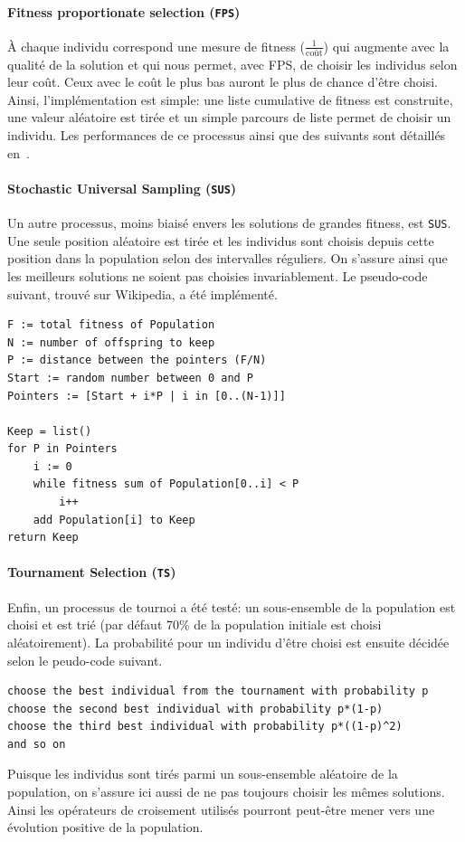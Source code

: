 \documentclass[10pt]{article}
\begin{document}
		\paragraph{Fitness proportionate selection (\texttt{FPS})}{
			À chaque individu correspond une mesure de fitness ($\frac{1}{\text{coût}}$) qui augmente avec la qualité de la solution et qui nous permet, avec FPS, de choisir les individus selon leur coût. Ceux avec le coût le plus bas auront le plus de chance d'être choisi. Ainsi, l'implémentation est simple: une liste cumulative de fitness est construite, une valeur aléatoire est tirée et un simple parcours de liste permet de choisir un individu. Les performances de ce processus ainsi que des suivants sont détaillés en~.
		}
		\paragraph{Stochastic Universal Sampling (\texttt{SUS})}{
			Un autre processus, moins biaisé envers les solutions de grandes fitness, est \texttt{SUS}. Une seule position aléatoire est tirée et les individus sont choisis depuis cette position dans la population selon des intervalles réguliers. On s'assure ainsi que les meilleurs solutions ne soient pas choisies invariablement. Le pseudo-code suivant, trouvé sur Wikipedia, a été implémenté.
			\begin{lstlisting}
F := total fitness of Population
N := number of offspring to keep
P := distance between the pointers (F/N)
Start := random number between 0 and P
Pointers := [Start + i*P | i in [0..(N-1)]]

Keep = list()
for P in Pointers
    i := 0
    while fitness sum of Population[0..i] < P
        i++
    add Population[i] to Keep
return Keep
			\end{lstlisting}
		}
		\paragraph{Tournament Selection (\texttt{TS})}{
		Enfin, un processus de tournoi a été testé: un sous-ensemble de la population est choisi et est trié (par défaut 70\% de la population initiale est choisi aléatoirement). La probabilité pour un individu d'être choisi est ensuite décidée selon le peudo-code suivant.
			\begin{lstlisting}
choose the best individual from the tournament with probability p
choose the second best individual with probability p*(1-p)
choose the third best individual with probability p*((1-p)^2)
and so on
			\end{lstlisting}		
		Puisque les individus sont tirés parmi un sous-ensemble aléatoire de la population, on s'assure ici aussi de ne pas toujours choisir les mêmes solutions. Ainsi les opérateurs de croisement utilisés pourront peut-être mener vers une évolution positive de la population.
		}
\end{document}
